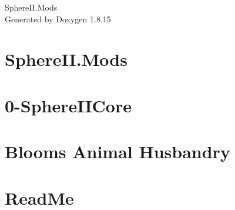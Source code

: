 \let\mypdfximage\pdfximage\def\pdfximage{\immediate\mypdfximage}\documentclass[twoside]{book}
\newcommand{\+}{\discretionary{\mbox{\scriptsize$\hookleftarrow$}}{}{}}
\newcommand{\clearemptydoublepage}{%
  \newpage{\pagestyle{empty}\cleardoublepage}%
}
\begin{document}
\hypersetup{pageanchor=false,
             bookmarksnumbered=true,
             pdfencoding=unicode
            }
\begin{titlepage}
\vspace*{7cm}
\begin{center}%
{\Large Sphere\+I\+I.\+Mods }\\
\vspace*{1cm}
{\large Generated by Doxygen 1.8.15}\\
\end{center}
\end{titlepage}
\clearemptydoublepage
{}
\tableofcontents
\clearemptydoublepage
{}
\hypersetup{pageanchor=true}

\chapter{Sphere\+I\+I.\+Mods}
\label{index}\hypertarget{index}{}
\chapter{0-\/Sphere\+I\+I\+Core}
\label{md__c_1__users_jkilpatrick__documents__git_hub__sphere_i_i_8_mods_0-_sphere_i_i_core__read_me}

\chapter{Blooms Animal Husbandry}
\label{md__c_1__users_jkilpatrick__documents__git_hub__sphere_i_i_8_mods__blooms__animal__husbandry__read_me}

\chapter{Read\+Me}
\label{md__c_1__users_jkilpatrick__documents__git_hub__sphere_i_i_8_mods__dishong__tower__challenge__read_me}

\end{document}
